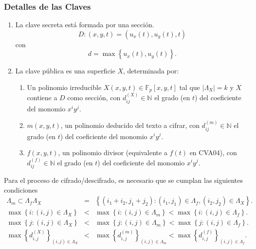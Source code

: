 \documentclass[11pt]{article}
\newcommand{\N}{\mathbb{N}}
\newcommand{\Fp}{\mathbb{F}_p}
\newcommand{\izq}{\left\{ }
\newcommand{\der}{\right\} }
\numberwithin{equation}{section} %
\numberwithin{figure}{section} %
\numberwithin{table}{section} %
\begin{document}
			\subsubsection{Detalles de las Claves}
			\label{411CLAVES}

				\begin{enumerate}%
					\item La clave secreta est\'a formada por una secci\'on.%
						$$
							D: (x,y,t)=(u_x(t),u_y(t),t)
						$$
						con
						$$
							d=\max\izq u_x(t),u_y(t)\der.
						$$
					\item La clave p\'ublica es una superficie $X$, determinada por:%
					\begin{enumerate}%
						\item Un polinomio irreducible $X(x,y,t)\in\Fp[x,y,t]$ tal que $|\Lambda_X|=k$ y $X$ contiene a $D$ como secci\'on, con $d^{(X)}_{ij}\in\N$ el grado (en $t$) del coeficiente del monomio $x^iy^j$.%
						\item $m(x,y,t)$, un polinomio deducido del texto a cifrar, con $d^{(m)}_{ij}\in\N$ el grado (en $t$) del coeficiente del monomio $x^iy^j$.%
						\item $f(x,y,t)$, un polinomio divisor (equivalente a $f(t)$ en CVA04), con $d^{(f)}_{ij}\in\N$ el grado (en $t$) del coeficiente del monomio $x^iy^j$.%
					\end{enumerate}%
			\end{enumerate}%
		
			Para el proceso de cifrado/descifrado, es necesario que se cumplan las siguientes condiciones
			\begin{eqnarray}
				\Lambda_m\subset\Lambda_f\Lambda_X &=&\izq(i_1+i_2,j_1+j_2):(i_1,j_1)\in\Lambda_f,(i_2,j_2)\in\Lambda_X\der.\nonumber\\
				\max\izq i:(i,j)\in\Lambda_X\der &<& \max\izq i:(i,j)\in\Lambda_m\der <\max\izq i:(i,j)\in\Lambda_f\der.\nonumber\\
				\max\izq j:(i,j)\in\Lambda_X\der &<& \max\izq j:(i,j)\in\Lambda_m\der <\max\izq j:(i,j)\in\Lambda_f\der.\nonumber\\
				\max\izq d_{i,j}^{(X)}\der_{(i,j)\in \Lambda_X}&<&\max\izq d_{i,j}^{(m)}\der_{(i,j)\in \Lambda_m} <\max\izq d_{i,j}^{(f)}\der_{(i,j)\in\Lambda_f}.\nonumber
			\end{eqnarray}
\end{document}

